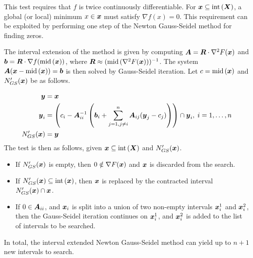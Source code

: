 \documentclass[../global-optimization.tex]{subfiles}
\begin{document}
  This test requires that $f$ is twice continuously differentiable.
  For $\x \subseteq \Iint (\X)$, a global (or local) minimum 
  $x \in \x$ must satisfy $\nabla f(x) = 0$.
  This requirement can be exploited by performing 
  one step of the Newton Gauss-Seidel method for finding zeros.
  
  The interval extension of the method is given by computing 
  $\A = \R \cdot \nabla^2 F(\x)$ and $\b = \R \cdot \nabla f(\Imid(\x))$, 
  where $\R \approx (\Imid (\nabla^2 F(\x)))^{-1}$.
  The system $\A (\x - \Imid(\x)) = \b$ is then solved by Gauss-Seidel iteration.
  Let $c = \Imid(\x)$ and $N'_{GS}(\x)$ be as follows.

  \begin{align*}
    \y &= \x \\
    \y_i &= \left( c_i - \A_{ii}^{-1} \left( \b_i + \sum_{j=1,j \neq i}^n \A_{ij} (\y_j - c_j) \right) \right) \cap \y_i,\; i = 1,\dots,n \\
    N'_{GS}(\x) &= \y
  \end{align*}
  The test is then as follows, given $\x \subseteq \Iint(\X)$ and $N'_{GS}(\x)$.

  \begin{itemize}
    \item If $N'_{GS}(\x)$ is empty, then $0 \notin \nabla F(\x)$ and $\x$ is discarded from the search.
    \item If $N'_{GS}(\x) \subseteq \Iint(\x)$, then $\x$ is replaced by the contracted interval \linebreak $N'_{GS}(\x) \cap \x$.
    \item If $0 \in \A_{ii}$, and $\x_i$ is split into a union of two non-empty intervals $\x_i^1$ and $\x_i^2$, then the Gauss-Seidel iteration continues on $\x_i^1$, and $\x_i^2$ is added to the list of intervals to be searched.
  \end{itemize}
  In total, the interval extended Newton Gauss-Seidel method can yield up to $n+1$ new intervals to search.
\end{document}
